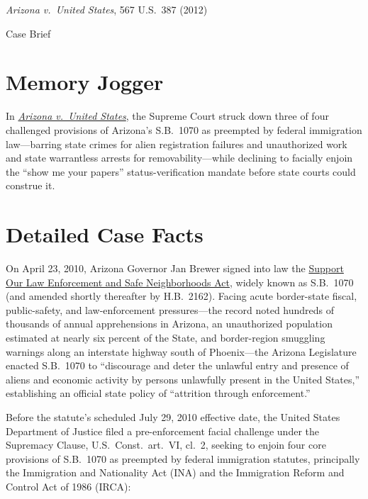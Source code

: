 \documentclass[12pt]{article}
\begin{document}
\begin{center}
{\LARGE \textit{Arizona v.\ United States}, 567 U.S.\ 387 (2012)\par}
\vspace{0.8em}
{\large Case Brief\par}
\end{center}
\vspace{1em}

\section{Memory Jogger}

In \href{https://supreme.justia.com/cases/federal/us/567/387/}{\textit{Arizona v.\ United States}}, the Supreme Court struck down three of four challenged provisions of Arizona's S.B.\ 1070 as preempted by federal immigration law---barring state crimes for alien registration failures and unauthorized work and state warrantless arrests for removability---while declining to facially enjoin the ``show me your papers'' status-verification mandate before state courts could construe it.

\section{Detailed Case Facts}

On April 23, 2010, Arizona Governor Jan Brewer signed into law the \href{https://www.law.cornell.edu/wex/support_our_law_enforcement_and_safe_neighborhoods_act_of_2010}{Support Our Law Enforcement and Safe Neighborhoods Act}, widely known as S.B.\ 1070 (and amended shortly thereafter by H.B.\ 2162). Facing acute border-state fiscal, public-safety, and law-enforcement pressures---the record noted hundreds of thousands of annual apprehensions in Arizona, an unauthorized population estimated at nearly six percent of the State, and border-region smuggling warnings along an interstate highway south of Phoenix---the Arizona Legislature enacted S.B.\ 1070 to ``discourage and deter the unlawful entry and presence of aliens and economic activity by persons unlawfully present in the United States,'' establishing an official state policy of ``attrition through enforcement.''

Before the statute's scheduled July 29, 2010 effective date, the United States Department of Justice filed a pre-enforcement facial challenge under the Supremacy Clause, U.S.\ Const.\ art.\ VI, cl.\ 2, seeking to enjoin four core provisions of S.B.\ 1070 as preempted by federal immigration statutes, principally the Immigration and Nationality Act (INA) and the Immigration Reform and Control Act of 1986 (IRCA):
\end{document}
